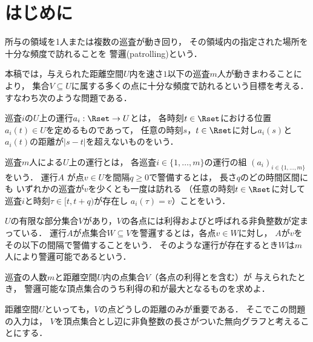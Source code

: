 
\section{はじめに}
所与の領域を1人または複数の巡査が動き回り，
その領域内の指定された場所を十分な頻度で訪れることを
警邏(patrolling)という\cite{chen2013fence, coene2011charlemagne, czyzowicz2011boundary}．


本稿では，与えられた距離空間$U$内を速さ$1$以下の巡査$m$人が動きまわることにより，
集合$V \subseteq U$に属する多くの点に十分な頻度で訪れるという目標を考える．
すなわち次のような問題である．

巡査$i$の$U$上の運行$a_i: \Rset \to U$とは，
各時刻$t \in \Rset$における位置$a _i (t) \in U$を定めるものであって，
任意の時刻$s$，$t \in \Rset$に対し$a _i (s)$と$a _i (t)$の距離が$\lvert s - t \rvert$を超えないものをいう．

巡査$m$人による$U$上の運行とは，
各巡査$i \in \{1, \ldots, m\}$の運行の組
$(a _i) _{i \in \{1, \ldots, m\}}$
をいう．
%
%
運行$A$
が点$v \in U$を間隔$q \geq 0$で警備するとは，
長さ$q$のどの時間区間にも
いずれかの巡査が$v$を少くとも一度は訪れる
（任意の時刻$t \in \Rset$に対して
巡査$i$と時刻$\tau \in [t, t + q)$が存在し
$a _i (\tau) = v$）ことをいう．

$U$の有限な部分集合$V$があり，$V$の各点には利得および{\timelimit}と呼ばれる非負整数が定まっている．
運行$A$が点集合$W \subseteq V$を警邏するとは，各点$v \in W$に対し，
$A$が$v$をその{\timelimit}以下の間隔で警備することをいう．
そのような運行が存在するとき$W$は$m$人により警邏可能であるという．

\begin{cooperativepatrollingproblem}
    巡査の人数$m$と距離空間$U$内の点集合$V$（各点の利得と{\timelimit}を含む）が
    与えられたとき，
    警邏可能な頂点集合のうち利得の和が最大となるものを求めよ．
\end{cooperativepatrollingproblem}

距離空間$U$といっても，$V$の点どうしの距離のみが重要である．
そこでこの問題の入力は，
$V$を頂点集合とし辺に非負整数の長さがついた無向グラフと考えることにする．



